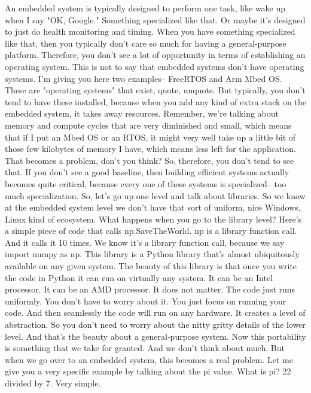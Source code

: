 An embedded system is typically designed to perform one task, like wake up when I say "OK, Google." Something specialized like that.
Or maybe it's designed to just do health monitoring and timing.
When you have something specialized like that, then you typically don't care so much for having a general-purpose platform.
Therefore, you don't see a lot of opportunity in terms of establishing an operating system.
This is not to say that embedded systems don't have operating systems.
I'm giving you here two examples-- FreeRTOS and Arm Mbed OS.
These are "operating systems" that exist, quote, unquote.
But typically, you don't tend to have these installed, because when you add any kind of extra stack on the embedded system, it takes away resources.
Remember, we're talking about memory and compute cycles that are very diminished and small, which means that if I put an Mbed OS or an RTOS, it might very well take up a little bit of those few kilobytes of memory I have, which means less left for the application.
That becomes a problem, don't you think?
So, therefore, you don't tend to see that.
If you don't see a good baseline, then building efficient systems actually becomes quite critical, because every one of these systems is specialized-- too much specialization.
So, let's go up one level and talk about libraries.
So we know at the embedded system level we don't have that sort of uniform, nice Windows, Linux kind of ecosystem.
What happens when you go to the library level?
Here's a simple piece of code that calls np.SaveTheWorld.
np is a library function call.
And it calls it 10 times.
We know it's a library function call, because we say import numpy as np.
This library is a Python library that's almost ubiquitously available on any given system.
The beauty of this library is that once you write the code in Python it can run on virtually any system.
It can be an Intel processor.
It can be an AMD processor.
It does not matter.
The code just runs uniformly.
You don't have to worry about it.
You just focus on running your code.
And then seamlessly the code will run on any hardware.
It creates a level of abstraction.
So you don't need to worry about the nitty gritty details of the lower level.
And that's the beauty about a general-purpose system.
Now this portability is something that we take for granted.
And we don't think about much.
But when we go over to an embedded system, this becomes a real problem.
Let me give you a very specific example by talking about the pi value.
What is pi?
22 divided by 7.
Very simple.




